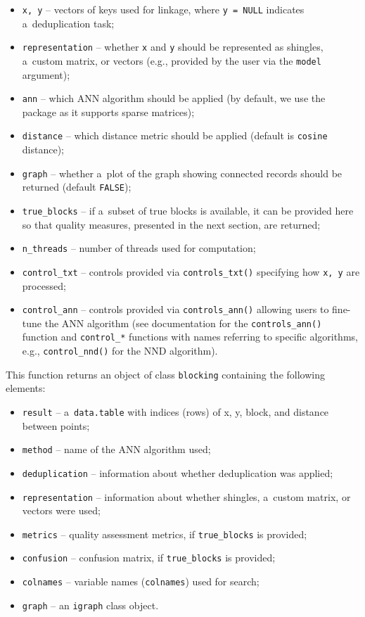 \begin{itemize}
\tightlist
\item
  \texttt{x,\ y} -- vectors of keys used for linkage, where \texttt{y\ =\ NULL}
  indicates a~deduplication task;
\item
  \texttt{representation} -- whether \texttt{x} and \texttt{y} should be represented as
  shingles, a~custom matrix, or vectors (e.g., provided by the user
  via the \texttt{model} argument);
\item
  \texttt{ann} -- which ANN algorithm should be applied (by default, we use
  the  package as it supports sparse matrices);
\item
  \texttt{distance} -- which distance metric should be applied (default is
  \texttt{cosine} distance);
\item
  \texttt{graph} -- whether a~plot of the graph showing connected records
  should be returned (default \texttt{FALSE});
\item
  \texttt{true\_blocks} -- if a~subset of true blocks is available, it can be
  provided here so that quality measures, presented in the next
  section, are returned;
\item
  \texttt{n\_threads} -- number of threads used for computation;
\item
  \texttt{control\_txt} -- controls provided via \texttt{controls\_txt()} specifying
  how \texttt{x,\ y} are processed;
\item
  \texttt{control\_ann} -- controls provided via \texttt{controls\_ann()} allowing
  users to fine-tune the ANN algorithm (see documentation for the
  \texttt{controls\_ann()} function and \texttt{control\_*} functions with names
  referring to specific algorithms, e.g., \texttt{control\_nnd()} for the NND
  algorithm).
\end{itemize}

This function returns an object of class \texttt{blocking} containing the
following elements:

\begin{itemize}
\tightlist
\item
  \texttt{result} -- a~\texttt{data.table} with indices (rows) of x, y, block, and
  distance between points;
\item
  \texttt{method} -- name of the ANN algorithm used;
\item
  \texttt{deduplication} -- information about whether deduplication was
  applied;
\item
  \texttt{representation} -- information about whether shingles, a~custom
  matrix, or vectors were used;
\item
  \texttt{metrics} -- quality assessment metrics, if \texttt{true\_blocks} is
  provided;
\item
  \texttt{confusion} -- confusion matrix, if \texttt{true\_blocks} is provided;
\item
  \texttt{colnames} -- variable names (\texttt{colnames}) used for search;
\item
  \texttt{graph} -- an \texttt{igraph} class object.
\end{itemize}

